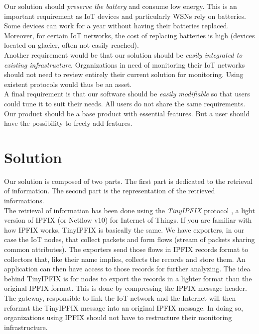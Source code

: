 Our solution should \textit{preserve the battery} and consume low energy. This is an important requirement as IoT devices and particularly WSNs rely on batteries. Some devices can work for a year without having their batteries replaced. Moreover, for certain IoT networks, the cost of replacing batteries is high (devices located on glacier, often not easily reached).\\

Another requirement would be that our solution should be \textit{easily integrated to existing infrastructure}. Organizations in need of monitoring their IoT networks should not need to review entirely their current solution for monitoring. Using existent protocols would thus be an asset. \\

A final requirement is that our software should be \textit{easily modifiable} so that users could tune it to suit their needs. All users do not share the same requirements. Our product should be a base product with essential features. But a user should have the possibility to freely add features.

\section*{Solution}

Our solution is composed of two parts. The first part is dedicated to the retrieval of information. The second part is the representation of the retrieved informations. \\

The retrieval of information has been done using the \textit{TinyIPFIX} protocol \cite{schmitt2016tinyipfix}, a light version of IPFIX (or Netflow v10) for Internet of Things. If you are familiar with how IPFIX works, TinyIPFIX is basically the same. We have exporters, in our case the IoT nodes, that collect packets and form flows (stream of packets sharing common attributes). The exporters send those flows in IPFIX records format to collectors that, like their name implies, collects the records and store them. An application can then have access to those records for further analyzing. The idea behind TinyIPFIX is for nodes to export the records in a lighter format than the original IPFIX format. This is done by compressing the IPFIX message header. The gateway, responsible to link the IoT network and the Internet will then reformat the TinyIPFIX message into an original IPFIX message. In doing so, organizations using IPFIX should not have to restructure their monitoring infrastructure. \\

